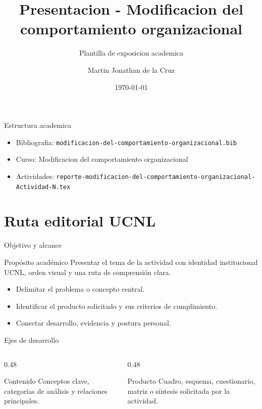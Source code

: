 ﻿\documentclass[spanish,aspectratio=169]{beamer}
\title{Presentacion - Modificacion del comportamiento organizacional}
\subtitle{Plantilla de exposicion academica}
\author{Martin Jonathan de la Cruz}
\institute{Universidad Ciudadana de Nuevo Leon}
\date{\today}
\begin{document}
\begin{frame}
  \titlepage
\end{frame}

\begin{frame}{Estructura academica}
  \begin{itemize}
    \item Bibliografia: \texttt{modificacion-del-comportamiento-organizacional.bib}
    \item Curso: Modificacion del comportamiento organizacional
    \item Actividades: \texttt{reporte-modificacion-del-comportamiento-organizacional-Actividad-N.tex}
  \end{itemize}
\end{frame}


\section{Ruta editorial UCNL}

\begin{frame}{Objetivo y alcance}
  \begin{block}{Propósito académico}
    Presentar el tema de la actividad con identidad institucional UCNL, orden visual y una ruta de comprensión clara.
  \end{block}
  \begin{itemize}
    \item Delimitar el problema o concepto central.
    \item Identificar el producto solicitado y sus criterios de cumplimiento.
    \item Conectar desarrollo, evidencia y postura personal.
  \end{itemize}
\end{frame}

\begin{frame}{Ejes de desarrollo}
  \begin{columns}[T,totalwidth=\textwidth]
    \begin{column}{0.48\textwidth}
      \begin{block}{Contenido}
        Conceptos clave, categorías de análisis y relaciones principales.
      \end{block}
    \end{column}
    \begin{column}{0.48\textwidth}
      \begin{block}{Producto}
        Cuadro, esquema, cuestionario, matriz o síntesis solicitada por la actividad.
      \end{block}
    \end{column}
  \end{columns}
\end{frame}
\end{document}
